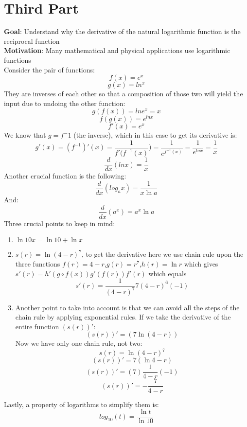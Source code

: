 \documentclass[12pt, letterpaper]{article}
\begin{document}
\section{Third Part}
\textbf{Goal}: Understand why the derivative of the natural logarithmic function is the reciprocal function\\
\newline
\textbf{Motivation}: Many mathematical and physical applications use logarithmic functions\\
\newline
Consider the pair of functions:
\[f(x) = e^x\]
\[g(x) = ln^x\]
They are inverses of each other so that a composition of those two will yield the input due to undoing the other function:
\[g(f(x)) = lne^x = x\]
\[f(g(x)) = e^{lnx}\]
\[f'(x) = e^x\]
We know that \(g = f^-1\) (the inverse), which in this case to get its derivative is:
\[g'(x) = (f^{-1})'(x) = \frac{1}{f'(f^{-1}(x)}) = \frac{1}{e^{f^{-1}(x)}} = \frac{1}{e^{lnx}} = \frac{1}{x}\]
\[\frac{d}{dx}(lnx) = \frac{1}{x}\]
Another crucial function is the following:
\[\frac{d}{dx}(log_{a}x) = \frac{1}{x \ln{a}}\]
And:
\[\frac{d}{dx}(a^x) = a^x\ln{a}\]
Three crucial points to keep in mind:
\begin{enumerate}
    \item \(\ln{10x} = \ln{10} + \ln{x}\)
    \item \(s(r)=\ln{(4-r)^7}\), to get the derivative here we use chain rule upon the three functions \(f(r)=4-r\),\(g(r)=r^7\),\(h(r)=\ln{r}\) which gives \(s'(r)=h'(g \circ f(x))g'(f(r))f'(r)\) which equals
    \[s'(r)=\frac{1}{(4-r)^7}7(4-r)^{6}(-1)\]
    \item Another point to take into account is that we can avoid all the steps of the chain rule by applying exponential rules. If we take the derivative of the entire function \((s(r))'\):
    \[(s(r))'=(7\ln{(4-r)})\]
    Now we have only one chain rule, not two:
    \[s(r)=\ln{(4-r)^7}\]
    \[(s(r))'=7(\ln{4-r})\]
    \[(s(r))'=(7)\frac{1}{4-r}(-1)\]
    \[(s(r))'=-\frac{7}{4-r}\]
\end{enumerate}
Lastly, a property of logarithms to simplify them is:
\[log_{10}(t) = \frac{\ln{t}}{\ln{10}}\]
\end{document}
